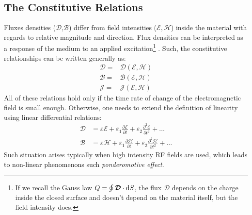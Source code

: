 \subsection{The Constitutive Relations}
Fluxes densities ($\mathcal{D}$,$\mathcal{B}$) differ from field intensities ($\mathcal{E},\mathcal{H}$) inside the material  with regards to relative magnitude and direction. Flux densities can be interpreted  as a response of the medium to an applied excitation\footnote{If we recall the Gauss law $	Q = \oint \boldsymbol{\mathcal{D}} \cdot \mathop{}\!\mathrm{d} S$, the flux $\boldsymbol{\mathcal{D}}$ depends on the charge inside the closed surface and doesn't depend on the material itself, but the field intensity does. 	}
. Such, the constitutive relationships can be written generally as:
\begin{subequations}
	\begin{align}
		\boldsymbol{\mathcal{D}} =& \boldsymbol{\mathcal{D}}(\boldsymbol{\mathcal{E}},\boldsymbol{\mathcal{H}}) \\
		\boldsymbol{\mathcal{B}} =& \boldsymbol{\mathcal{B}}(\boldsymbol{\mathcal{E}},\boldsymbol{\mathcal{H}}) \\
		\boldsymbol{\mathcal{J}} =& \boldsymbol{\mathcal{J}}(\boldsymbol{\mathcal{E}},\boldsymbol{\mathcal{H}})
	\end{align}
\end{subequations}
All of these relations hold only if the time rate of change of the electromagnetic field is small enough. Otherwise, one needs to extend the definition of linearity using linear differential relations\parencite{Harrington2001, Jackson1998}:
\begin{subequations}
	\begin{align}
	\boldsymbol{\mathcal{D}} &= \varepsilon \boldsymbol{\mathcal{E}} + \varepsilon_1 \frac{\partial \boldsymbol{\mathcal{E}}}{\partial t} + \varepsilon_2 \frac{\partial^2 \boldsymbol{\mathcal{E}}}{\partial t^2} + \ldots \\
	\boldsymbol{\mathcal{B}} &= \varepsilon \boldsymbol{\mathcal{H}} + \varepsilon_1 \frac{\partial \boldsymbol{\mathcal{H}}}{\partial t} + \varepsilon_2 \frac{\partial^2 \boldsymbol{\mathcal{H}}}{\partial t^2} + \ldots
	\end{align}
\end{subequations}
Such situation arises typically when high intensity RF fields are used, which leads to non-linear phenomenons such \emph{ponderomotive effect}\parencite{Krapchev1979}.


